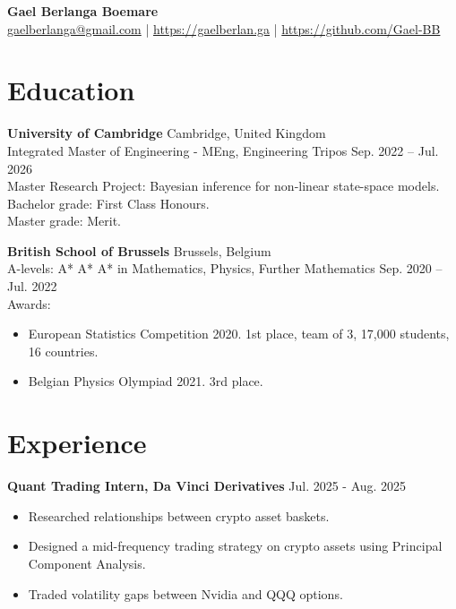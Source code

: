 \documentclass[a4paper,10pt]{article}
\begin{document}
\noindent
\begin{center}
    \textbf{Gael Berlanga Boemare}
    \\
    \href{mailto:gaelberlanga@gmail.com}{gaelberlanga@gmail.com} \quad | \quad \url{https://gaelberlan.ga} \quad | \quad \url{https://github.com/Gael-BB}
\end{center}

\section*{Education}

\noindent
\textbf{University of Cambridge} \hfill Cambridge, United Kingdom \\
Integrated Master of Engineering - MEng, Engineering Tripos \hfill Sep. 2022 – Jul. 2026 \\
Master Research Project: Bayesian inference for non-linear state-space models. \\
Bachelor grade: First Class Honours. \\
Master grade: Merit.
\medskip

\noindent
\textbf{British School of Brussels} \hfill Brussels, Belgium \\
A-levels: A* A* A* in Mathematics, Physics, Further Mathematics \hfill Sep. 2020 – Jul. 2022 \\
Awards:
\begin{itemize}[noitemsep, topsep=0pt, parsep=0pt, partopsep=0pt]
    \item European Statistics Competition 2020. 1st place, team of 3, 17,000 students, 16 countries.
    \item Belgian Physics Olympiad 2021. 3rd place.
\end{itemize}

\section*{Experience}

\noindent
\textbf{Quant Trading Intern, Da Vinci Derivatives} \hfill Jul. 2025 - Aug. 2025
\begin{itemize}[noitemsep, topsep=0pt, parsep=0pt, partopsep=0pt]
    \item Researched relationships between crypto asset baskets.
    \item Designed a mid-frequency trading strategy on crypto assets using Principal Component Analysis.
    \item Traded volatility gaps between Nvidia and QQQ options.
\end{itemize}
\end{document}

